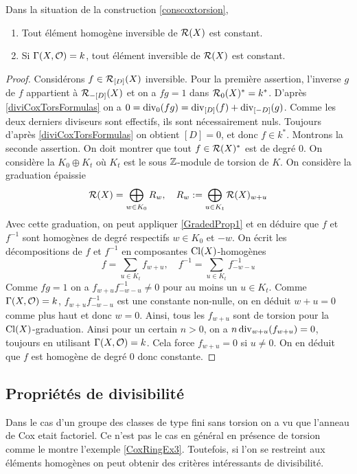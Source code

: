 \begin{prop}
Dans la situation de la construction \ref{conscoxtorsion},
\begin{enumerate}
\item Tout élément homogène inversible de $\mathcal{R}(X)$ est constant.
\item Si $\Gamma(X, \mathcal{O})=k$, tout élément inversible de $\mathcal{R}(X)$ est constant.
\end{enumerate}
\end{prop}
\begin{proof}
Considérons $f\in\mathcal{R}_{[D]}(X)$ inversible. Pour la première assertion, l'inverse $g$ de $f$ appartient à $\mathcal{R}_{-[D]}(X)$ et on a $fg=1$ dans $\mathcal{R}_0(X)^*=k^*$. D'après \ref{diviCoxTorsFormulas} on a $0=\operatorname{div}_0(fg)=\operatorname{div}_{[D]}(f)+\operatorname{div}_{[-D]}(g)$. Comme les deux derniers diviseurs sont effectifs, ils sont nécessairement nuls. Toujours d'après \ref{diviCoxTorsFormulas} on obtient $[D]=0$, et donc $f\in k^*$.
Montrons la seconde assertion. On doit montrer que tout $f\in\mathcal{R}(X)^*$ est de degré $0$. On considère la $K_0\oplus K_t$ où $K_t$ est le sous $\mathbb{Z}$-module de torsion de $K$.
On considère la graduation épaissie 
$$\mathcal{R}(X)=\bigoplus_{w\in K_0}R_w,\,\,\,\,\,\, R_w:=\bigoplus_{u\in K_t}\mathcal{R}(X)_{w+u}$$
Avec cette graduation, on peut appliquer \ref{GradedProp1} et en déduire que $f$ et $f^{-1}$ sont homogènes de degré respectifs $w\in K_0$ et $-w$. On écrit les décompositions de $f$ et $f^{-1}$ en composantes $\operatorname{Cl}(X)$-homogènes
$$f=\sum_{u\in K_t}f_{w+u},\,\,\,\,\,\, f^{-1}=\sum_{u\in K_t}f^{-1}_{-w-u}$$
Comme $fg=1$ on a $f_{w+u}f^{-1}_{-w-u}\neq 0$ pour au moins un $u\in K_t$. Comme $\Gamma(X, \mathcal{O})=k$, $f_{w+u}f^{-1}_{-w-u}$ est une constante non-nulle, on en déduit $w+u=0$ comme plus haut et donc $w=0$. Ainsi, tous les $f_{w+u}$ sont de torsion pour la $\operatorname{Cl}(X)$-graduation. Ainsi pour un certain $n>0$, on a $n\operatorname{div}_{w+u}(f_{w+u})=0$, toujours en utilisant $\Gamma(X, \mathcal{O})=k$. Cela force $f_{w+u}=0$ si $u\neq 0$. On en déduit que $f$ est homogène de degré $0$ donc constante.
\end{proof}

\subsection{Propriétés de divisibilité}

Dans le cas d'un groupe des classes de type fini sans torsion on a vu que l'anneau de Cox etait factoriel. Ce n'est pas le cas en général en présence de torsion comme le montre l'exemple \ref{CoxRingEx3}. Toutefois, si l'on se restreint aux éléments homogènes on peut obtenir des critères intéressants de divisibilité. 

